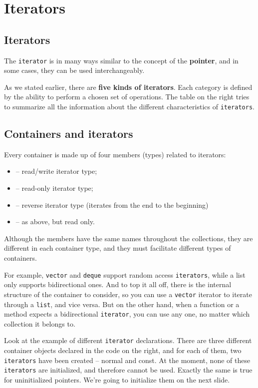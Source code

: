 %
%
%
\section{Iterators} %
\subsection{Iterators} %
The \texttt{iterator} is in many ways similar to the concept of the \textbf{pointer}, and in some cases, 
they can be used interchangeably.

As we stated earlier, there are \textbf{five kinds of iterators}. Each category is defined by the ability 
to perform a chosen set of operations. The table on the right tries to summarize all the information about 
the different characteristics of \texttt{iterators}.

\subsection{Containers and iterators} %
Every container is made up of four members (types) related to iterators:
\begin{itemize}
    \item {} – read/write iterator type;
    \item {} – read-only iterator type;
    \item {} – reverse iterator type (iterates from the end to the beginning)
    \item {} – as above, but read only.
\end{itemize}
Although the members have the same names throughout the collections, they are different in each container type, 
and  they must facilitate different types of containers.

For example, \texttt{vector} and \texttt{deque} support random access \texttt{iterators}, while a list only 
supports bidirectional ones. And to top it all off, there is the internal structure of the container to consider, 
so you can use a \texttt{vector} iterator to iterate through a \texttt{list}, and vice versa. But on the other hand, 
when a function or a method expects a bidirectional \texttt{iterator}, you can use any one, 
no matter which collection it belongs to.

Look at the example of different \texttt{iterator} declarations.
There are three different container objects declared in the code on the right, and for each of them, 
two \texttt{iterators} have been created – normal and const. At the moment, none of these \texttt{iterators} are 
initialized, and therefore cannot be used. Exactly the same is true for uninitialized pointers. We’re going to 
initialize them on the next slide.

